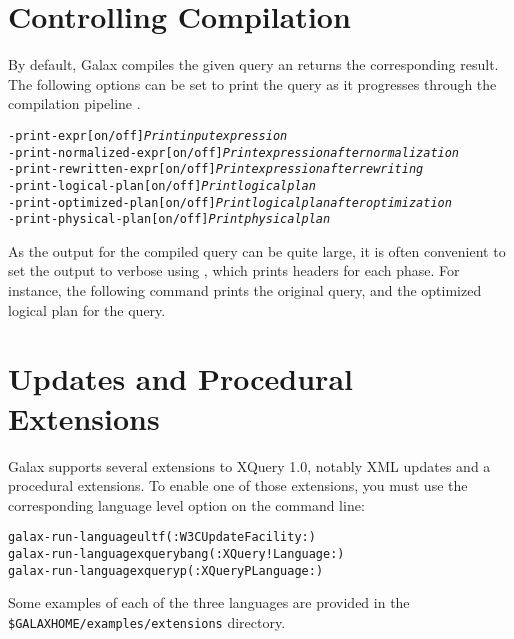 \section{Controlling Compilation}

By default, Galax compiles the given query an returns the
corresponding result. The following options can be set to print the
query as it progresses through the compilation pipeline .

\begin{alltt}
  -print-expr [on/off] \emph{Print input expression}
  -print-normalized-expr [on/off] \emph{Print expression after normalization}
  -print-rewritten-expr [on/off] \emph{Print expression after rewriting}
  -print-logical-plan [on/off] \emph{Print logical plan}
  -print-optimized-plan [on/off] \emph{Print logical plan after optimization}
  -print-physical-plan [on/off] \emph{Print physical plan}
\end{alltt}

As the output for the compiled query can be quite large, it is often
convenient to set the output to verbose using ,
which prints headers for each phase. For instance, the following
command prints the original query, and the optimized logical plan for
the query.

\begin{alltt}
% galax-run docnode.xq -verbose on -print-expr on -print-optimized-plan on
\end{alltt}

\section{Updates and Procedural Extensions}

Galax supports several extensions to XQuery 1.0, notably XML updates
and a procedural extensions. To enable one of those extensions, you
must use the corresponding language level option on the command line:

\begin{alltt}
galax-run -language ultf       (: W3C Update Facility :)
galax-run -language xquerybang (: XQuery! Language :)
galax-run -language xqueryp    (: XQueryP Language :)
\end{alltt}

Some examples of each of the three languages are provided in the
\verb+$GALAXHOME/examples/extensions+ directory.
